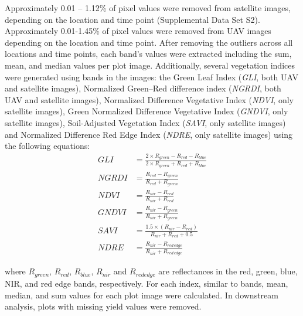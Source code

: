 \documentclass[12pt,twoside]{gsag3jnl}
\begin{document}
Approximately 0.01 -- 1.12\% of pixel values were removed from satellite images, depending on the location and time point (Supplemental Data Set S2). Approximately 0.01-1.45\% of pixel values were removed from UAV images depending on the location and time point. After removing the outliers across all locations and time points, each band's values were extracted including the sum, mean, and median values per plot image. 
Additionally, several vegetation indices were generated using  bands in the images: the Green Leaf Index (\textit{GLI}, both UAV and satellite images), Normalized Green–Red difference index (\textit{NGRDI}, both UAV and satellite images), Normalized Difference Vegetative Index (\textit{NDVI}, only satellite images), Green Normalized Difference Vegetative Index (\textit{GNDVI}, only satellite images), Soil-Adjusted Vegetation Index (\textit{SAVI}, only satellite images) and Normalized Difference Red Edge Index (\textit{NDRE}, only satellite images) using the following equations:
\begin{align}
GLI & =\frac{2\times R_{green}-R_{red}-R_{blue}}{2\times R_{green}+R_{red}+R_{blue}}\\
NGRDI & =\frac{R_{red}-R_{green}}{R_{red}+R_{green}}\\
NDVI & =\frac{R_{nir}-R_{red}}{R_{nir}+R_{red}}\\
GNDVI & = \frac{R_{nir}-R_{green}}{R_{nir}+R_{green}}\\
SAVI & = \frac{1.5\times (R_{nir}-R_{red})}{R_{nir}+R_{red}+0.5}\\
NDRE & =\frac{R_{nir}-R_{red\,edge}}{R_{nir}+R_{red\,edge}}
\end{align}

where \textit{$R_{green}$}, \textit{$R_{red}$}, \textit{$R_{blue}$}, \textit{$R_{nir}$} and  \textit{$R_{rededge}$} are reflectances in the red, green, blue, NIR, and red edge bands, respectively. For each index, similar to bands, mean, median, and sum values for each plot image were calculated. In downstream analysis, plots with missing yield values were removed. 

\end{document}
